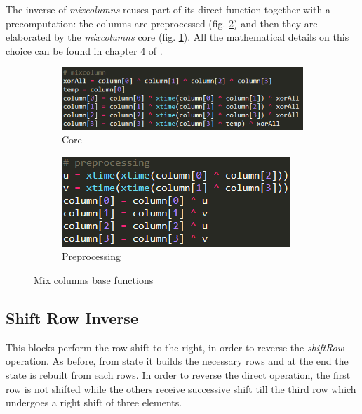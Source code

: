 \documentclass{article}
\begin{document}
The inverse of \textit{mixcolumns} reuses part of its direct function together with a precomputation: the columns are preprocessed (fig. \ref{fig:preprocessing}) and then they are elaborated by the \textit{mixcolumns} core (fig. \ref{fig:core}). All the mathematical details on this choice can be found in chapter 4 of \cite{10.5555/560131}. 

\begin{figure}[H]
\centering
\begin{subfigure}{.54\textwidth}
  \centering
  \includegraphics[width=1\linewidth]{images/mixcolumn.png}
  \caption{Core}
  \label{fig:core}
\end{subfigure}
\begin{subfigure}{.35\textwidth}
  \centering
  \includegraphics[width=1\linewidth]{images/preprocessing.png}
  \caption{Preprocessing}
  \label{fig:preprocessing}
\end{subfigure}
\caption{Mix columns base functions}
\label{fig:MixColumns}
\end{figure}

\subsection{Shift Row Inverse}

This blocks perform the row shift to the right, in order to reverse the \textit{shiftRow} operation. As before, from state it builds the necessary rows and at the end the state is rebuilt from each rows. In order to reverse the direct operation, the first row is not shifted while the others receive successive shift till the third row which undergoes a right shift of three elements.
\end{document}
